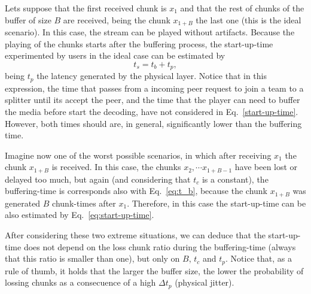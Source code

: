 Lets suppose that the first received chunk is $x_1$ and that the rest
of chunks of the buffer of size $B$ are received, being the chunk
$x_{1+B}$ the last one (this is the ideal scenario). In this case, the
stream can be played without artifacts. Because the playing of the
chunks starts after the buffering process, the \gls{start-up-time}
experimented by users in the ideal case can be estimated by
\begin{equation}
  t_s = t_b + t_p,
  \label{eq:start-up-time}
\end{equation}
being $t_p$ the latency generated by the physical layer. Notice that
in this expression, the time that passes from a incoming peer request
to join a team to a splitter until its accept the peer, and the time
that the player can need to buffer the media before start the
decoding, have not considered in Eq.~\ref{start-up-time}. However,
both times should are, in general, significantly lower than the
buffering time.

Imagine now one of the worst possible scenarios, in which after
receiving $x_1$ the chunk $x_{1+B}$ is received. In this case, the
chunks $x_2, \cdots x_{1+B-1}$ have been lost or delayed too much, but
again (and considering that $t_c$ is a constant), the buffering-time
is corresponds also with Eq.~\ref{eq:t_b}, because the chunk $x_{1+B}$
was generated $B$ chunk-times after $x_1$. Therefore, in this case the
start-up-time can be also estimated by Eq.~\ref{eq:start-up-time}.

After considering these two extreme situations, we can deduce that the
start-up-time does not depend on the loss chunk ratio during the
buffering-time (always that this ratio is smaller than one), but only
on $B$, $t_c$ and $t_p$. Notice that, as a rule of thumb, it holds
that the larger the buffer size, the lower the probability of lossing
chunks as a consecuence of a high $\Delta t_p$ (physical jitter).
